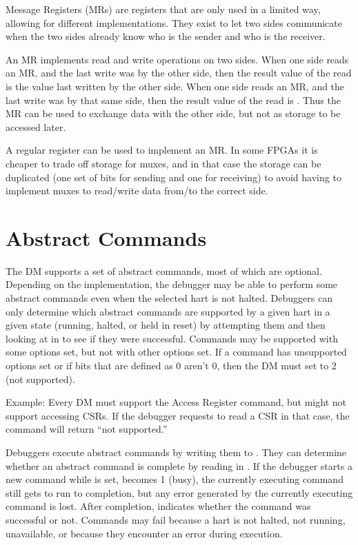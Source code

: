 Message Registers (MRs) are registers that are only used in a limited way,
allowing for different implementations. They exist to let two sides communicate
when the two sides already know who is the sender and who is the receiver.

An MR implements read and write operations on two sides.  When one side reads an
MR, and the last write was by the other side, then the result value of the read
is the value last written by the other side.  When one side reads an MR, and the
last write was by that same side, then the result value of the read is
\unspecified.  Thus the MR can be used to exchange data with the other side, but
not as storage to be accessed later.

\begin{commentary}
    A regular register can be used to implement an MR. In some FPGAs it is
    cheaper to trade off storage for muxes, and in that case the storage can be
    duplicated (one set of bits for sending and one for receiving) to avoid
    having to implement muxes to read/write data from/to the correct side.
\end{commentary}

\section{Abstract Commands} \label{abstractcommands}

The DM supports a set of abstract commands, most of which
are optional. Depending on the implementation, the debugger may
be able to perform
some abstract commands even when the selected hart is not halted.
Debuggers can only determine which abstract commands
are supported by a given hart in a given state (running, halted, or held in reset) by attempting them
and then looking at \FdmAbstractcsCmderr in \RdmAbstractcs to see if they were successful.
Commands may be supported with some options set, but not with other options
set. If a command has unsupported options set or if bits that are defined as 0
aren't 0, then the DM must set \FdmAbstractcsCmderr to 2 (not supported).

\begin{commentary}
    Example: Every DM must support the Access Register command, but might not
    support accessing CSRs. If the debugger requests to read a CSR in that
    case, the command will return ``not supported.''
\end{commentary}

Debuggers execute abstract commands by writing them to \RdmCommand.  They
can determine whether an abstract command is complete by reading \FdmAbstractcsBusy in
\RdmAbstractcs. If the debugger starts a new command while \FdmAbstractcsBusy is set,
\FdmAbstractcsCmderr becomes 1 (busy), the currently executing command still gets to
run to completion, but any error generated by the currently executing command is lost.
After completion, \FdmAbstractcsCmderr indicates whether the command was
successful or not. Commands may fail because a hart is not halted, not running,
unavailable, or because they encounter an error during execution.

